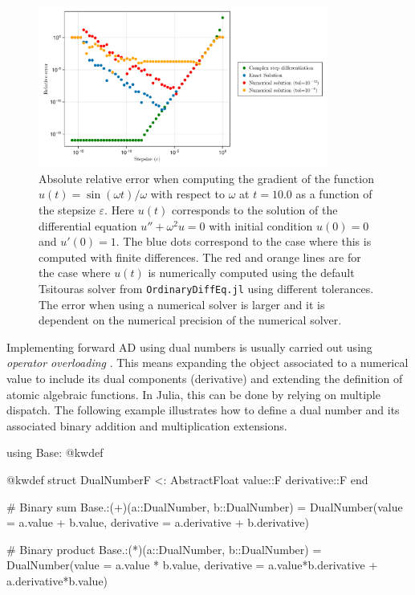 \begin{figure}[tbh]
    \centering
    \includegraphics[width=0.85\textwidth]{../code/finite_differences/finite_difference_derivative.pdf}
    \caption{Absolute relative error when computing the gradient of the function $u(t) = \sin (\omega t)/\omega$ with respect to $\omega$ at $t=10.0$ as a function of the stepsize $\varepsilon$. Here $u(t)$ corresponds to the solution of the differential equation $u'' + \omega^2 u = 0$ with initial condition $u(0)=0$ and $u'(0)=1$. The blue dots correspond to the case where this is computed with finite differences. The red and orange lines are for the case where $u(t)$ is numerically computed using the default Tsitouras solver \cite{Tsitouras_2011} from \texttt{OrdinaryDiffEq.jl} using different tolerances. The error when using a numerical solver is larger and it is dependent on the numerical precision of the numerical solver. }
    \label{fig:finite-diff}
\end{figure}


Implementing forward AD using dual numbers is usually carried out using \textit{operator overloading} \cite{Neuenhofen_2018}. 
This means expanding the object associated to a numerical value to include its dual components (derivative) and extending the definition of atomic algebraic functions. 
In Julia, this can be done by relying on multiple dispatch. 
The following example illustrates how to define a dual number and its associated binary addition and multiplication extensions. 
\begin{jllisting}
using Base: @kwdef

@kwdef struct DualNumber{F <: AbstractFloat}
    value::F
    derivative::F
end

# Binary sum
Base.:(+)(a::DualNumber, b::DualNumber) = DualNumber(value = a.value + b.value, derivative = a.derivative + b.derivative)

# Binary product 
Base.:(*)(a::DualNumber, b::DualNumber) = DualNumber(value = a.value * b.value, derivative = a.value*b.derivative + a.derivative*b.value)
\end{jllisting}

